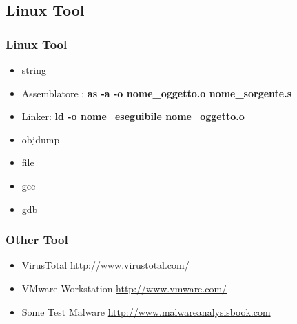 \documentclass[]{beamer}
\begin{document}
	\subsection{Linux Tool}
		\begin{frame}
			\frametitle{Linux Tool}
			\begin{itemize}
				\item{string }
				\item{Assemblatore : \textbf{as -a -o nome\_oggetto.o nome\_sorgente.s}}
				\item{Linker: \textbf{ld -o nome\_eseguibile nome\_oggetto.o}}
				\item{objdump}
				\item{file}
				\item{gcc}
				\item{gdb}
			\end{itemize}
		\end{frame}
		\begin{frame}
			\frametitle{Other Tool}
			\begin{itemize}
				\item{VirusTotal \url{http://www.virustotal.com/}}
				\item{VMware Workstation \url{http://www.vmware.com/}}
				\item{Some Test Malware \url{http://www.malwareanalysisbook.com}}
			\end{itemize}	
		\end{frame}
\end{document}
